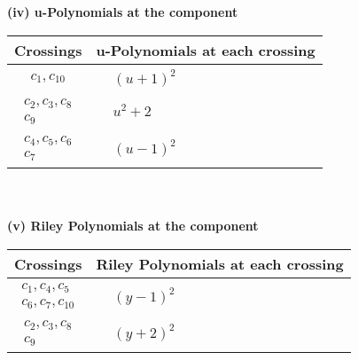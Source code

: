 \documentclass[1p]{elsarticle_modified}
\theoremstyle{definition}
\begin{document}
\newpage\renewcommand{\arraystretch}{1}
\flushleft \textbf{(iv) u-Polynomials at the component}\newline \\
\begin{tabular}{m{50pt}|m{274pt}}
Crossings & \hspace{64pt}u-Polynomials at each crossing \\
\hline $$\begin{aligned}c_{1},c_{10}\end{aligned}$$&$\begin{aligned}
&(u+1)^2
\end{aligned}$\\
\hline $$\begin{aligned}c_{2},c_{3},c_{8}\\c_{9}\end{aligned}$$&$\begin{aligned}
&u^2+2
\end{aligned}$\\
\hline $$\begin{aligned}c_{4},c_{5},c_{6}\\c_{7}\end{aligned}$$&$\begin{aligned}
&(u-1)^2
\end{aligned}$\\
\hline
\end{tabular}\\~\\
\newpage\renewcommand{\arraystretch}{1}
\flushleft \textbf{(v) Riley Polynomials at the component}\newline \\
\begin{tabular}{m{50pt}|m{274pt}}
Crossings & \hspace{64pt}Riley Polynomials at each crossing \\
\hline $$\begin{aligned}c_{1},c_{4},c_{5}\\c_{6},c_{7},c_{10}\end{aligned}$$&$\begin{aligned}
&(y-1)^2
\end{aligned}$\\
\hline $$\begin{aligned}c_{2},c_{3},c_{8}\\c_{9}\end{aligned}$$&$\begin{aligned}
&(y+2)^2
\end{aligned}$\\
\hline
\end{tabular}\\~\\
\end{document}
